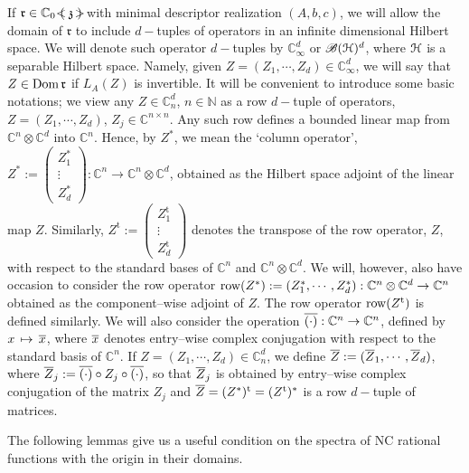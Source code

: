 \documentclass{article}
\theoremstyle{definition}
\theoremstyle{remark}
\numberwithin{equation}{section}
\newcommand{\bsm}{\left ( \begin{smallmatrix}}
\newcommand{\esm}{\end{smallmatrix} \right) }
\newcommand{\mr}{\ensuremath{\mathrm}}
\newcommand{\scr}{\ensuremath{\mathscr}}
\newcommand{\mf}{\ensuremath{\mathfrak}}
\newcommand{\ov}{\ensuremath{\overline}}
\def\C{\mathbb{C}}
\def\N{\mathbb{N}}
\def\fr{\mathfrak{r}}
\def\mrt{\mathrm{t}}
\def\nbdom{\mr{Dom} \, }
\def\ratfps{\C _0 \ \mathclap{\, <}{\left( \right.} \,  \mf{z} \, \mathclap{ \, \, \, \, >}{\left. \right)} }
\begin{document}
If $\fr \in \ratfps$ with minimal descriptor realization $(A,b,c)$, we will allow the domain of $\fr$ to include $d-$tuples of operators in an infinite dimensional Hilbert space. We will denote such operator $d-$tuples by $\C ^d _\infty$ or $\scr{B} (\cH ) ^d$, where ${\mathcal H}$ is a separable Hilbert space. Namely, given $Z = (Z_1 , \cdots , Z_d ) \in \C ^d _\infty$, we will say that $Z \in \nbdom \fr$ if $L_A (Z)$ is invertible.  It will be convenient to introduce some basic notations; we view any $Z \in \C ^d _n$, $n \in \N $ as a row $d-$tuple of operators, $Z = (Z_1 , \cdots , Z_d )$, $Z_j \in \C ^{n\times n}$. Any such row defines a bounded linear map from $\C ^n \otimes \C ^d$ into $\C ^n$. Hence, by $Z^*$, we mean the `column operator', $Z^* := \bsm Z_1 ^* \\ \vdots \\ Z_d ^* \esm : \C ^n \rightarrow \C ^n \otimes \C ^d$, obtained as the Hilbert space adjoint of the linear map $Z$. Similarly, $Z^{\mrt} := \bsm Z_1 ^\mrt \\ \vdots \\ Z_d ^\mrt \esm$ denotes the transpose of the row operator, $Z$, with respect to the standard bases of $\C ^n$ and $\C ^n \otimes \C ^d$. We will, however, also have occasion to consider the row operator $\mr{row} (Z^* ) := (Z_1 ^* , \cdots , Z_d ^* ) : \C ^n \otimes \C ^d \rightarrow \C ^n$ obtained as the component--wise adjoint of $Z$. The row operator $\mr{row} (Z^\mrt )$ is defined similarly. We will also consider the operation $\ov{( \cdot )} : \C ^n \rightarrow \C ^n$, defined by $x \, \mapsto \, \ov{x}$, where $\ov{x}$ denotes entry--wise complex conjugation with respect to the standard basis of $\C ^n$. If $Z = (Z_1 , \cdots , Z_d ) \in \C ^d _n$, we define $\ov{Z} := (\ov{Z} _1 , \cdots , \ov{Z} _d )$, where $\ov{Z} _j := \ov{(\cdot)} \circ Z_j \circ \ov{(\cdot)}$, so that $\ov{Z} _j$ is obtained by entry--wise complex conjugation of the matrix $Z_j$ and $\ov{Z} = (Z^* ) ^\mrt = (Z^\mrt) ^*$ is a row $d-$tuple of matrices.

The following lemmas give us a useful condition on the spectra of NC rational functions with the origin in their domains.
\end{document}
